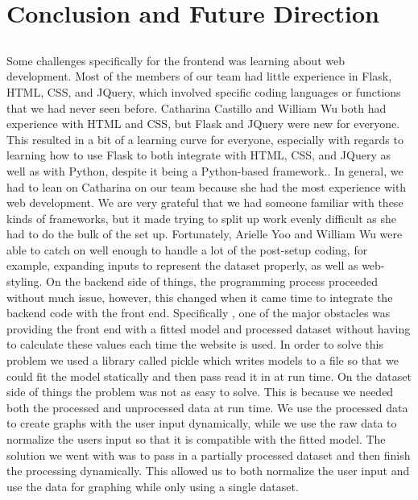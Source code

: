 \documentclass[12pt]{article}
\begin{document}
\section*{Conclusion and Future Direction}
\subsection*{}
Some challenges specifically for the frontend was learning about web development. Most of the members of our team had little experience in Flask, HTML, CSS, and JQuery, which involved specific coding languages or functions that we had never seen before. Catharina Castillo and William Wu both had experience with HTML and CSS, but Flask and JQuery were new for everyone. This resulted in a bit of a learning curve for everyone, especially with regards to learning how to use Flask to both integrate with HTML, CSS, and JQuery as well as with Python, despite it being a Python-based framework.. In general, we had to lean on Catharina on our team because she had the most experience with web development. We are very grateful that we had someone familiar with these kinds of frameworks, but it made trying to split up work evenly difficult as she had to do the bulk of the set up. Fortunately, Arielle Yoo and William Wu were able to catch on well enough to handle a lot of the post-setup coding, for example, expanding inputs to represent the dataset properly, as well as web-styling.
	On the backend side of things, the programming process proceeded without much issue, however, this changed when it came time to integrate the backend code with the front end. Specifically , one of the major obstacles was providing the front end with a fitted model and processed dataset without having to calculate these values each time the website is used. In order to solve this problem we used a library called pickle which writes models to a file so that we could fit the model statically and then pass read it in at run time. On the dataset side of things the problem was not as easy to solve. This is because we needed both the processed and unprocessed data at run time. We use the processed data to create graphs with the user input dynamically, while we use the raw data to normalize the users input so that it is compatible with the fitted model. The solution we went with was to pass in a partially processed dataset and then finish the processing dynamically. This allowed us to both normalize the user input and use the data for graphing while only using a single dataset.  
\end{document}
